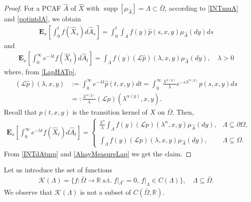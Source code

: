 \documentclass[11pt,a4paper]{article}
\begin{document}
\begin{proof}
For a PCAF $\hat{A}$ of $\hat{X}$ with $\operatorname{supp}[\mu_{\hat{A}}] = \Lambda \subset \bar{\Omega}$, according to \eqref{INTmuA} and \eqref{potintdA}, we obtain
\begin{align}
\label{AhatMeasure}
\mathbf{E}_x\left[\int_0^t f(\hat{X}_s) d\hat{A}_s \right] = \int_0^t \int_\Lambda f(y) \hat{p}(s,x,y) \mu_{\hat{A}}(dy) ds
\end{align}
and
\begin{align}
\label{AhayMeasureLap}
\mathbf{E}_x\left[ \int_0^\infty e^{-\lambda t} f(\hat{X}_t) d\hat{A}_t \right] = \int_\Lambda f(y) (\mathcal{L}\hat{p})(\lambda, x,y) \mu_{\hat{A}}(dy), \quad \lambda>0
\end{align}
where, from \eqref{LapHATp},
\begin{align*}
(\mathcal{L}\hat{p})(\lambda, x, y) 
& :=  \int_0^\infty e^{-\lambda t} \hat{p}(t,x,y) dt = \int_0^\infty \frac{\lambda^{\alpha(y)}}{\lambda} e^{-s\lambda^{\alpha(y)}} p(s,x,y) ds \\
& =: \frac{\lambda^{\alpha(y)}}{\lambda} (\mathcal{L}p)(\lambda^{\alpha(y)},x,y).
\end{align*}
Recall that $p(t,x,y)$ is the transition kernel of $X$ on $\bar{\Omega}$. 
Then,
\begin{align}
\label{INTdAtmp}
\mathbf{E}_x\left[\int_0^\infty e^{-\lambda t} f(\hat{X}_t) d\hat{A}_t \right] = 
\left\lbrace
\begin{array}{ll}
\displaystyle \frac{\lambda^\alpha}{\lambda} \int_\Lambda f(y) (\mathcal{L}p)(\lambda^\alpha, x,y) \mu_{\hat{A}}(dy), & \Lambda \subseteq \partial \Omega,\\ 
\\
\displaystyle \int_\Lambda f(y) (\mathcal{L}p)(\lambda, x,y) \mu_{\hat{A}}(dy), & \Lambda \subseteq \Omega.
\end{array}
\right.
\end{align}
From \eqref{INTdAtmp} and \eqref{AhayMeasureLap} we get the claim.
\end{proof}

Let us introduce the set of functions
\begin{align*}
\mathcal{K}(\Lambda) = \{ f: \bar{\Omega} \to \mathbb{R}\; \textrm{s.t.} \; f|_{\Lambda^c} =0,\, f|_{\Lambda} \in C(\Lambda)\}, \quad \Lambda \subseteq \bar{\Omega}.
\end{align*}
We observe that $\mathcal{K}(\Lambda)$ is not a subset of $C(\bar{\Omega}, \mathbb{R})$.
\end{document}
